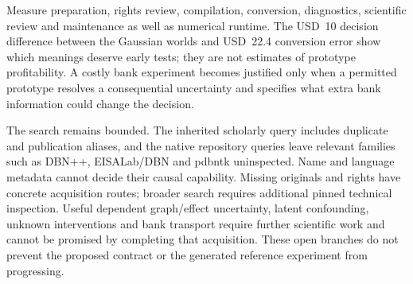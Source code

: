 Measure preparation, rights review, compilation, conversion, diagnostics,
scientific review and maintenance as well as numerical runtime. The USD~10
decision difference between the Gaussian worlds and USD~22.4 conversion error
show which meanings deserve early tests; they are not estimates of prototype
profitability. A costly bank experiment becomes justified only when a permitted
prototype resolves a consequential uncertainty and specifies what extra bank
information could change the decision.\citep{exec16_ct_oracle,exec16_ct_design}

The search remains bounded. The inherited scholarly query includes duplicate
and publication aliases, and the native repository queries leave relevant
families such as DBN++, EISALab/DBN and pdbntk uninspected. Name and language
metadata cannot decide their causal capability. Missing originals and rights
have concrete acquisition routes; broader search requires additional pinned
technical inspection. Useful dependent graph/effect uncertainty, latent
confounding, unknown interventions and bank transport require further
scientific work and cannot be promised by completing that acquisition.
These open branches do not prevent the proposed contract or the generated
reference experiment from progressing.\citep{exec16_ct_design}
\label{exec16:cxx-temporal-end}
